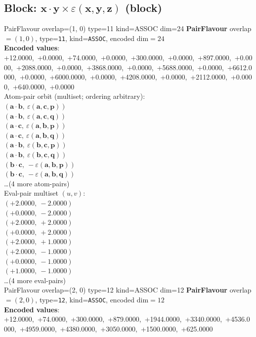 \documentclass[a4paper,11pt]{article}
\newcommand{\pdcegfomjfhook}[2]{\mathbf{#1} \cdot \mathbf{#2}}
\newcommand{\kblbmcpggoncpf}[3]{\varepsilon(\mathbf{#1},\mathbf{#2},\mathbf{#3})}
\begin{document}
\subsection{Block: $\pdcegfomjfhook{x}{y} \times \kblbmcpggoncpf{x}{y}{z}$  (block)}
    PairFlavour  overlap=(1, 0)  type=11  kind=ASSOC  dim=24
\textbf{PairFlavour} overlap$=(1, 0)$, type=\texttt{11}, kind=\texttt{ASSOC}, encoded dim$=24$\\
\textbf{      Encoded values}: +12.0000,\ +0.0000,\ +74.0000,\ +0.0000,\ +300.0000,\ +0.0000,\ +897.0000,\ +0.0000,\ +2088.0000,\ +0.0000,\ +3868.0000,\ +0.0000,\ +5688.0000,\ +0.0000,\ +6612.0000,\ +0.0000,\ +6000.0000,\ +0.0000,\ +4208.0000,\ +0.0000,\ +2112.0000,\ +0.0000,\ +640.0000,\ +0.0000\\
\quad Atom-pair orbit (multiset; ordering arbitrary):\\
$(\pdcegfomjfhook{a}{b},\ \kblbmcpggoncpf{a}{c}{p})$\\
$(\pdcegfomjfhook{a}{b},\ \kblbmcpggoncpf{a}{c}{q})$\\
$(\pdcegfomjfhook{a}{c},\ \kblbmcpggoncpf{a}{b}{p})$\\
$(\pdcegfomjfhook{a}{c},\ \kblbmcpggoncpf{a}{b}{q})$\\
$(\pdcegfomjfhook{a}{b},\ \kblbmcpggoncpf{b}{c}{p})$\\
$(\pdcegfomjfhook{a}{b},\ \kblbmcpggoncpf{b}{c}{q})$\\
$(\pdcegfomjfhook{b}{c},\ -\kblbmcpggoncpf{a}{b}{p})$\\
$(\pdcegfomjfhook{b}{c},\ -\kblbmcpggoncpf{a}{b}{q})$\\
\quad \ldots (4 more atom-pairs)\\
\quad Eval-pair multiset $(u, v)$:\\
$(+2.0000,\ -2.0000)$\\
$(+0.0000,\ -2.0000)$\\
$(+2.0000,\ +2.0000)$\\
$(+0.0000,\ +2.0000)$\\
$(+2.0000,\ +1.0000)$\\
$(+2.0000,\ -1.0000)$\\
$(+0.0000,\ -1.0000)$\\
$(+1.0000,\ -1.0000)$\\
\quad \ldots (4 more eval-pairs)\\
    PairFlavour  overlap=(2, 0)  type=12  kind=ASSOC  dim=12
\textbf{PairFlavour} overlap$=(2, 0)$, type=\texttt{12}, kind=\texttt{ASSOC}, encoded dim$=12$\\
\textbf{      Encoded values}: +12.0000,\ +74.0000,\ +300.0000,\ +879.0000,\ +1944.0000,\ +3340.0000,\ +4536.0000,\ +4959.0000,\ +4380.0000,\ +3050.0000,\ +1500.0000,\ +625.0000\\
\end{document}
